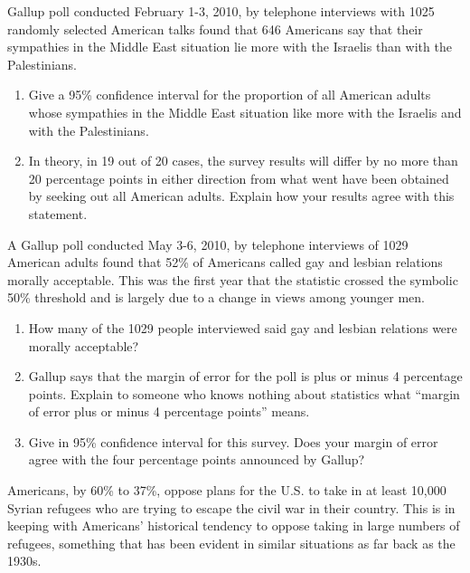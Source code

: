 \begin{Senumerate}
		\item Gallup poll conducted February 1-3, 2010, by telephone interviews with 1025 randomly selected American talks found that 646 Americans say that their sympathies in the Middle East situation lie more with the Israelis than with the Palestinians.
\begin{enumerate}
	\item Give a 95\% confidence interval for the proportion of all American adults whose sympathies in the Middle East situation like more with the Israelis and with the Palestinians. \vfill
	\item In theory,  in 19 out of 20 cases, the survey results will differ by no more than 20 percentage points in either direction from what went have been obtained by seeking out all American adults. Explain how your results agree with this statement.\vfill
\end{enumerate}

	\item A Gallup poll conducted May 3-6, 2010, by telephone interviews of 1029 American adults found that 52\% of Americans called gay and lesbian relations morally acceptable. This was the first year that the statistic crossed the symbolic 50\% threshold and is largely due to a change in views among younger men.
\begin{enumerate}
	\item How many of the 1029 people interviewed said gay and lesbian relations were morally acceptable? \vfill
	\item Gallup says that the margin of error for the poll is plus or  minus 4 percentage points. Explain to someone who knows nothing about statistics what ``margin of error plus or  minus 4 percentage points'' means. \vfill
	\item Give in 95\% confidence interval for this survey. Does your margin of error agree with the four percentage points announced by Gallup? \vfill
\end{enumerate}

\hwnewpage

\item Americans, by 60\% to 37\%, oppose plans for the U.S. to take in at least 10,000 Syrian refugees who are trying to escape the civil war in their country. This is in keeping with Americans' historical tendency to oppose taking in large numbers of refugees, something that has been evident in similar situations as far back as the 1930s.


\end{Senumerate}
